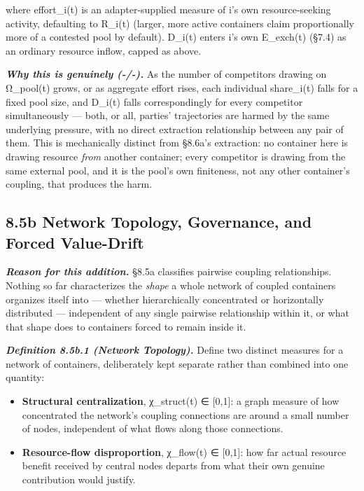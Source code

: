 \documentclass[
]{article}
\begin{document}
where effort\_i(t) is an adapter-supplied measure of i's own
resource-seeking activity, defaulting to R\_i(t) (larger, more active
containers claim proportionally more of a contested pool by default).
D\_i(t) enters i's own E\_exch(t) (§7.4) as an ordinary resource inflow,
capped as above.

\emph{\textbf{Why this is genuinely (-/-).}} As the number of
competitors drawing on Ω\_pool(t) grows, or as aggregate effort rises,
each individual share\_i(t) falls for a fixed pool size, and D\_i(t)
falls correspondingly for every competitor simultaneously --- both, or
all, parties' trajectories are harmed by the same underlying pressure,
with no direct extraction relationship between any pair of them. This is
mechanically distinct from §8.6a's extraction: no container here is
drawing resource \emph{from} another container; every competitor is
drawing from the same external pool, and it is the pool's own
finiteness, not any other container's coupling, that produces the harm.

\hypertarget{b-network-topology-governance-and-forced-value-drift}{%
\subsection{8.5b Network Topology, Governance, and Forced
Value-Drift}\label{b-network-topology-governance-and-forced-value-drift}}

\emph{\textbf{Reason for this addition.}} §8.5a classifies pairwise
coupling relationships. Nothing so far characterizes the \emph{shape} a
whole network of coupled containers organizes itself into --- whether
hierarchically concentrated or horizontally distributed --- independent
of any single pairwise relationship within it, or what that shape does
to containers forced to remain inside it.

\emph{\textbf{Definition 8.5b.1 (Network Topology).}} Define two
distinct measures for a network of containers, deliberately kept
separate rather than combined into one quantity:

\begin{itemize}
\item
  \textbf{Structural centralization}, χ\_struct(t) ∈ {[}0,1{]}: a graph
  measure of how concentrated the network's coupling connections are
  around a small number of nodes, independent of what flows along those
  connections.
\item
  \textbf{Resource-flow disproportion}, χ\_flow(t) ∈ {[}0,1{]}: how far
  actual resource benefit received by central nodes departs from what
  their own genuine contribution would justify.
\end{itemize}
\end{document}
